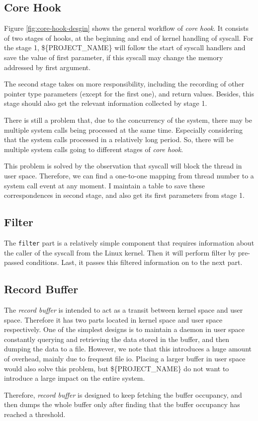 \subsection{Core Hook}

Figure \ref{fig:core-hook-desgin} shows the general workflow of \textit{core hook}. It consists of two stages of hooks, at the beginning and end of kernel handling of syscall. For the stage 1, \$\{PROJECT\_NAME\} will follow the start of syscall handlers and save the value of first parameter, if this syscall may change the memory addressed by first argument.


The second stage takes on more responsibility, including the recording of other pointer type parameters (except for the first one), and return values. Besides, this stage should also get the relevant information collected by stage 1.

There is still a problem that, due to the concurrency of the system, there may be multiple system calls being processed at the same time. Especially considering that the system calls processed in a relatively long period. So, there will be multiple system calls going to different stages of  \textit{core hook}.

This problem is solved by the observation that syscall will block the thread in user space. Therefore, we can find a one-to-one mapping from thread number to a system call event at any moment. I maintain a table to save these correspondences in second stage, and also get its first parameters from stage 1.

\subsection{Filter}

The \texttt{filter} part is a relatively simple component that requires information about the caller of the syscall from the Linux kernel. Then it will perform filter by pre-passed conditions. Last, it passes this filtered information on to the next part.

\subsection{Record Buffer}

The \textit{record buffer} is intended to act as a transit between kernel space and user space. Therefore it has two parts located in kernel space and user space respectively. One of the simplest designs is to maintain a daemon in user space constantly querying and retrieving the data stored in the buffer, and then dumping the data to a file. However, we note that this introduces a huge amount of overhead, mainly due to frequent file io. Placing a larger buffer in user space would also solve this problem, but \$\{PROJECT\_NAME\} do not want to introduce a large impact on the entire system.

Therefore, \textit{record buffer} is designed to keep fetching the buffer occupancy, and then dumps the whole buffer only after finding that the buffer occupancy has reached a threshold.